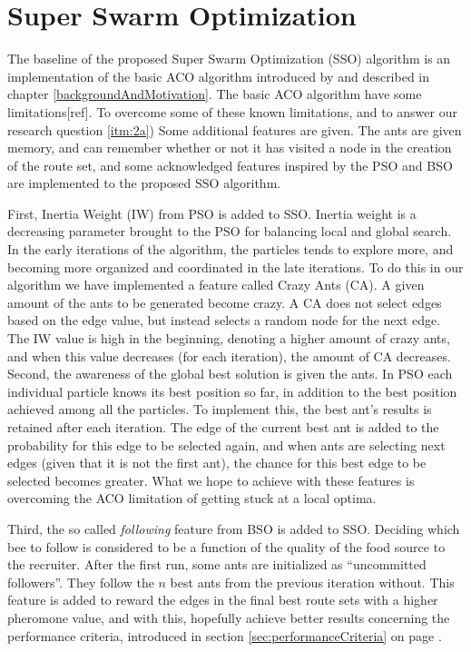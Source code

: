 \section{Super Swarm Optimization}

The baseline of the proposed Super Swarm Optimization (SSO) algorithm is an implementation of the basic ACO algorithm introduced by \citet{nanda11} and described in chapter \ref{backgroundAndMotivation}. The basic ACO algorithm have some limitations[ref]. To overcome some of these known limitations, and to answer our research question \ref{itm:2a}) %
Some additional features are given. The ants are given memory, and can remember whether or not it has visited a node in the creation of the route set, and some acknowledged features inspired by the PSO and BSO are implemented to the proposed SSO algorithm.

First, Inertia Weight (IW) from PSO is added to SSO. Inertia weight is a decreasing parameter brought to the PSO for balancing local and global search. In the early iterations of the algorithm, the particles tends to explore more, and becoming more organized and coordinated in the late iterations.  To do this in our algorithm we have implemented a feature called Crazy Ants (CA). A given amount of the ants to be generated become crazy. A CA does not select edges based on the edge value, but instead selects a random node for the next edge. The IW value is high in the beginning, denoting a higher amount of crazy ants, and when this value decreases (for each iteration), the amount of CA decreases. Second, the awareness of the global best solution is given the ants. In PSO each individual particle knows its best position so far, in addition to the best position achieved among all the particles. To implement this, the best ant's results is retained after each iteration. The edge of the current best ant is added to the probability for this edge to be selected again, and when ants are selecting next edges (given that it is not the first ant), the chance for this best edge to be selected becomes greater. What we hope to achieve with these features is overcoming the ACO limitation of getting stuck at a local optima.

Third, the so called \textit{following} feature from BSO is added to SSO. Deciding which bee to follow is considered to be a function of the quality of the food source to the recruiter. After the first run, some ants are initialized as ``uncommitted followers''. They follow the $n$ best ants from the previous iteration without. This feature is added to reward the edges in the final best route sets with a higher pheromone value, and with this, hopefully achieve better results concerning the performance criteria, introduced in section \ref{sec:performanceCriteria} on page \pageref{sec:performanceCriteria}. 


